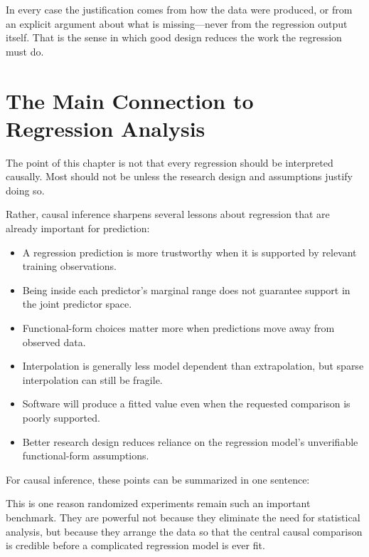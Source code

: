 \documentclass[11pt]{report}
\begin{document}
In every case the justification comes from how the data were produced, or from an explicit argument about what is missing---never from the regression output itself. That is the sense in which good design reduces the work the regression must do.

\section{The Main Connection to Regression Analysis}

The point of this chapter is not that every regression should be interpreted causally. Most should not be unless the research design and assumptions justify doing so.

Rather, causal inference sharpens several lessons about regression that are already important for prediction:

\begin{itemize}
    \item A regression prediction is more trustworthy when it is supported by relevant training observations.
    \item Being inside each predictor's marginal range does not guarantee support in the joint predictor space.
    \item Functional-form choices matter more when predictions move away from observed data.
    \item Interpolation is generally less model dependent than extrapolation, but sparse interpolation can still be fragile.
    \item Software will produce a fitted value even when the requested comparison is poorly supported.
    \item Better research design reduces reliance on the regression model's unverifiable functional-form assumptions.
\end{itemize}

For causal inference, these points can be summarized in one sentence:

\begin{center}
\end{center}

This is one reason randomized experiments remain such an important benchmark. They are powerful not because they eliminate the need for statistical analysis, but because they arrange the data so that the central causal comparison is credible before a complicated regression model is ever fit.
\end{document}
